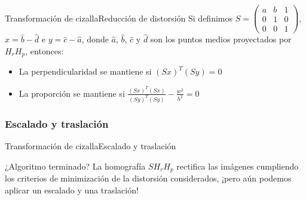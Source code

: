 \documentclass[14pt,spanish]{beamer}
\begin{document}
          \begin{frame}{Transformación de cizalla}{Reducción de distorsión}
              Si definimos $S = \begin{pmatrix}
                  a & b & 1\\
                  0 & 1 & 0\\
                  0 & 0 & 1
              \end{pmatrix}$, $x = \hat{b} - \hat{d}$ e $y = \hat{c} - \hat{a}$, donde $\hat{a}$, $\hat{b}$, $\hat{c}$ y $\hat{d}$ son los puntos medios proyectados por $H_r H_p$, entonces:

              \begin{itemize}
                  \item<2-> La perpendicularidad se mantiene si $(Sx)^T (Sy) = 0$
                  \item<3-> La proporción se mantiene si $\frac{(Sx)^T (Sx)}{(Sy)^T (Sy)} - \frac{w^2}{h^2} = 0$
              \end{itemize}

          \end{frame}

        \subsubsection{Escalado y traslación}
          \begin{frame}{Transformación de cizalla}{Escalado y traslación}
              \begin{alertblock}{¿Algoritmo terminado?}
                  La homografía $S H_r H_p$ rectifica las imágenes cumpliendo los criterios de minimización de la distorsión considerados, ¡pero aún podemos aplicar un escalado y una traslación!
              \end{alertblock}

          \end{frame}
\end{document}
